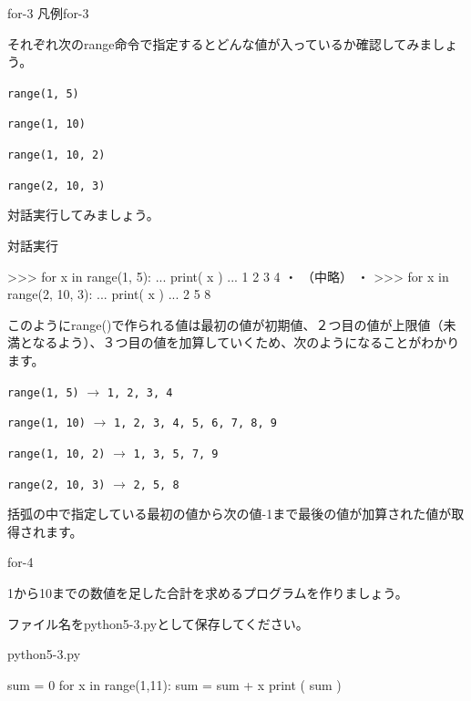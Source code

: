 \documentclass[11pt,a4paper,dvipdfmx,titlepage]{jsreport}
\begin{document}
\begin{pabox}{for-3}
凡例for-3

それぞれ次のrange命令で指定するとどんな値が入っているか確認してみましょう。
\begin{description}
\item {\tt range(1, 5)}
\item {\tt range(1, 10)}
\item {\tt range(1, 10, 2)}
\item {\tt range(2, 10, 3)}
\end{description}
 {\gt 対話実行}してみましょう。

\begin{legbox}{対話実行}
\begin{listing}{1}
>>> for x in range(1, 5):
...     print( x )
...
1
2
3
4
	・
	（中略）
	・
>>> for x in range(2, 10, 3):
...     print( x )
...
2
5
8
\end{listing}
\end{legbox}
\end{pabox}
このようにrange()で作られる値は最初の値が初期値、２つ目の値が上限値（未満となるよう）、３つ目の値を加算していくため、次のようになることがわかります。
\begin{description}
\item {\tt range(1, 5)} $\rightarrow$ {\tt 1, 2, 3, 4}
\item {\tt range(1, 10)}	$\rightarrow$	{\tt 1, 2, 3, 4, 5, 6, 7, 8, 9}
\item {\tt range(1, 10, 2)}	$\rightarrow$ {\tt 1, 3, 5, 7, 9}
\item {\tt range(2, 10, 3)}	$\rightarrow$ {\tt 2, 5, 8}
\end{description}
括弧の中で指定している最初の値から次の値-1まで最後の値が加算された値が取得されます。

\newpage
\begin{pabox}{for-4}

1から10までの数値を足した合計を求めるプログラムを作りましょう。

ファイル名をpython5-3.pyとして保存してください。
\begin{legbox}{python5-3.py}
\begin{listing}{1}
sum = 0
for x in range(1,11):
    sum = sum + x
print ( sum ) 
\end{listing}
\end{legbox}
\end{pabox}
\end{document}
